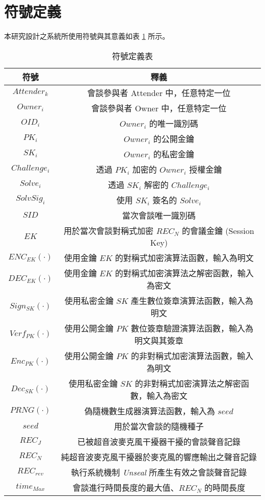 \section{符號定義}

    本研究設計之系統所使用符號與其意義如表 \ref{table:tab.symbol} 所示。

\begin{table}[H]
    \centering
    \caption{符號定義表}
    \label{table:tab.symbol}
    \begin{tabular}{ c c }
        \hline
        \bf{符號} & \bf{釋義} \\
        \hline
        $Attender_{k}$  & 會談參與者 Attender 中，任意特定一位 \\
        $Owner_{i}$     & 會談參與者 Owner 中，任意特定一位 \\
        $OID_{i}$       & $Owner_{i}$ 的唯一識別碼 \\
        $PK_{i}$        & $Owner_{i}$ 的公開金鑰 \\
        $SK_{i}$        & $Owner_{i}$ 的私密金鑰 \\
        $Challenge_{i}$ & 透過 $PK_{i}$ 加密的 $Owner_{i}$ 授權金鑰 \\
        $Solve_{i}$     & 透過 $SK_{i}$ 解密的 $Challenge_{i}$ \\
        $SolvSig_{i}$   & 使用 $SK_{i}$ 簽名的 $Solve_{i}$ \\
        $SID$           & 當次會談唯一識別碼 \\
        $EK$            & 用於當次會談對稱式加密 $REC_{N}$ 的會議金鑰 (Session Key) \\
        $ENC_{EK}(·)$   & 使用金鑰 $EK$ 的對稱式加密演算法函數，輸入為明文 \\
        $DEC_{EK}(·)$   & 使用金鑰 $EK$ 的對稱式加密演算法之解密函數，輸入為密文 \\
        $Sign_{SK}(·)$  & 使用私密金鑰 $SK$ 產生數位簽章演算法函數，輸入為明文 \\
        $Verf_{PK}(·)$  & 使用公開金鑰 $PK$ 數位簽章驗證演算法函數，輸入為明文與其簽章 \\
        $Enc_{PK}(·)$   & 使用公開金鑰 $PK$ 的非對稱式加密演算法函數，輸入為明文 \\
        $Dec_{SK}(·)$   & 使用私密金鑰 $SK$ 的非對稱式加密演算法之解密函數，輸入為密文 \\
        $PRNG(·)$       & 偽隨機數生成器演算法函數，輸入為 $seed$  \\
        $seed$          & 用於當次會談的隨機種子 \\
        $REC_{J}$       & 已被超音波麥克風干擾器干擾的會談聲音記錄 \\
        $REC_{N}$       & 純超音波麥克風干擾器於麥克風的響應輸出之聲音記錄 \\
        $REC_{rev}$     & 執行系統機制 {\it Unseal} 所產生有效之會談聲音記錄 \\
        $time_{Max}$    & 會談進行時間長度的最大值、$REC_{N}$ 的時間長度 \\

    \end{tabular}
\end{table}


